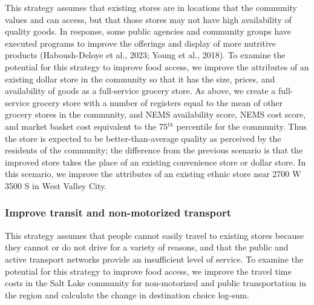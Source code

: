 \documentclass[
  letterpaper,
  number,
  review,
  3p]{elsarticle}
\begin{document}
This strategy assumes that existing stores are in locations that the
community values and can access, but that those stores may not have high
availability of quality goods. In response, some public agencies and
community groups have executed programs to improve the offerings and
display of more nutritive products (Haboush-Deloye et al., 2023; Young
et al., 2018). To examine the potential for this strategy to improve
food access, we improve the attributes of an existing dollar store in
the community so that it has the size, prices, and availability of goods
as a full-service grocery store. As above, we create a full-service
grocery store with a number of registers equal to the mean of other
grocery stores in the community, and NEMS availability score, NEMS cost
score, and market basket cost equivalent to the 75\(^{th}\) percentile
for the community. Thus the store is expected to be better-than-average
quality as perceived by the residents of the community; the difference
from the previous scenario is that the improved store takes the place of
an existing convenience store or dollar store. In this scenario, we
improve the attributes of an existing ethnic store near 2700 W 3500 S in
West Valley City.

\subsubsection{Improve transit and non-motorized
transport}\label{improve-transit-and-non-motorized-transport}

This strategy assumes that people cannot easily travel to existing
stores because they cannot or do not drive for a variety of reasons, and
that the public and active transport networks provide an insufficient
level of service. To examine the potential for this strategy to improve
food access, we improve the travel time costs in the Salt Lake community
for non-motorized and public transportation in the region and calculate
the change in destination choice log-sum.
\end{document}
